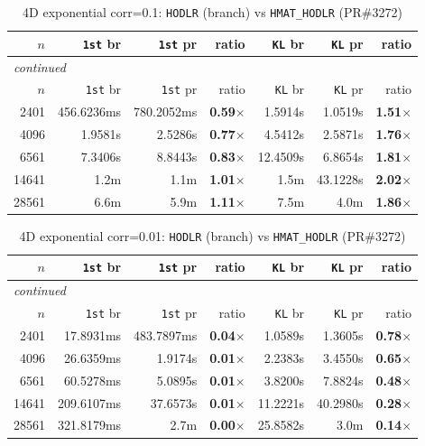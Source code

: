\documentclass[11pt,a4paper]{article}
\begin{document}
\small\begin{center}
\begin{longtable}{rrrrrrr}
\caption{4D exponential corr=0.1: \texttt{HODLR} (branch) vs \texttt{HMAT\_HODLR} (PR\#3272)}
\\\toprule
$n$ & \texttt{1st} br & \texttt{1st} pr & ratio & \texttt{KL} br & \texttt{KL} pr & ratio\\
\midrule
\endfirsthead
\multicolumn{7}{l}{\small\emph{continued}}\\
\toprule
$n$ & \texttt{1st} br & \texttt{1st} pr & ratio & \texttt{KL} br & \texttt{KL} pr & ratio\\
\midrule
\endhead

2401 & 456.6236ms & 780.2052ms & \textbf{0.59$\times$} & 1.5914s & 1.0519s & \textbf{1.51$\times$}\\
4096 & 1.9581s & 2.5286s & \textbf{0.77$\times$} & 4.5412s & 2.5871s & \textbf{1.76$\times$}\\
6561 & 7.3406s & 8.8443s & \textbf{0.83$\times$} & 12.4509s & 6.8654s & \textbf{1.81$\times$}\\
14641 & 1.2m & 1.1m & \textbf{1.01$\times$} & 1.5m & 43.1228s & \textbf{2.02$\times$}\\
28561 & 6.6m & 5.9m & \textbf{1.11$\times$} & 7.5m & 4.0m & \textbf{1.86$\times$}\\
\bottomrule\end{longtable}\end{center}
\small\begin{center}
\begin{longtable}{rrrrrrr}
\caption{4D exponential corr=0.01: \texttt{HODLR} (branch) vs \texttt{HMAT\_HODLR} (PR\#3272)}
\\\toprule
$n$ & \texttt{1st} br & \texttt{1st} pr & ratio & \texttt{KL} br & \texttt{KL} pr & ratio\\
\midrule
\endfirsthead
\multicolumn{7}{l}{\small\emph{continued}}\\
\toprule
$n$ & \texttt{1st} br & \texttt{1st} pr & ratio & \texttt{KL} br & \texttt{KL} pr & ratio\\
\midrule
\endhead

2401 & 17.8931ms & 483.7897ms & \textbf{0.04$\times$} & 1.0589s & 1.3605s & \textbf{0.78$\times$}\\
4096 & 26.6359ms & 1.9174s & \textbf{0.01$\times$} & 2.2383s & 3.4550s & \textbf{0.65$\times$}\\
6561 & 60.5278ms & 5.0895s & \textbf{0.01$\times$} & 3.8200s & 7.8824s & \textbf{0.48$\times$}\\
14641 & 209.6107ms & 37.6573s & \textbf{0.01$\times$} & 11.2221s & 40.2980s & \textbf{0.28$\times$}\\
28561 & 321.8179ms & 2.7m & \textbf{0.00$\times$} & 25.8582s & 3.0m & \textbf{0.14$\times$}\\
\bottomrule\end{longtable}\end{center}
\end{document}
